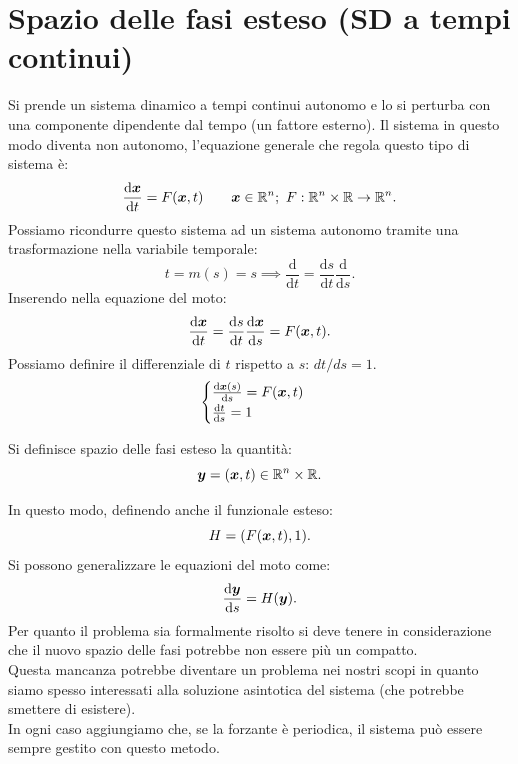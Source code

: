 \section{Spazio delle fasi esteso (SD a tempi continui)}%
\label{sub:Spazio delle fasi esteso (SD a tempi continui)}
Si prende un sistema dinamico a tempi continui autonomo e lo si perturba con una componente dipendente dal tempo (un fattore esterno). Il sistema in questo modo diventa non autonomo, l'equazione generale che regola questo tipo di sistema è:
\[
    \frac{\text{d} \boldsymbol{x}}{\text{d} t} = F(\boldsymbol{x},t) \qquad \boldsymbol{x}\in \mathbb{R}^n; \ F: \mathbb{R}^n \times \mathbb{R}\to \mathbb{R}^n
.\] 
Possiamo ricondurre questo sistema ad un sistema autonomo tramite una trasformazione nella variabile temporale:
\[
    t = m(s) = s \implies  \frac{\text{d} }{\text{d} t} = \frac{\text{d} s}{\text{d} t} \frac{\text{d} }{\text{d} s} 
.\] 
Inserendo nella equazione del moto:
\[
    \frac{\text{d} \boldsymbol{x}}{\text{d} t} = \frac{\text{d} s}{\text{d} t} \frac{\text{d} \boldsymbol{x}}{\text{d} s} = F(\boldsymbol{x}, t)
.\] 
Possiamo definire il differenziale di $t$  rispetto a $s$: $dt /ds = 1$.
\[
    \begin{cases}
	\frac{\text{d} \boldsymbol{x} (s)}{\text{d} s} = F(\boldsymbol{x}, t)\\
	\frac{\text{d} t}{\text{d} s} = 1
    \end{cases}
\] 
\begin{defn}
    Si definisce spazio delle fasi esteso la quantità:
    \[
	\boldsymbol{y} =(\boldsymbol{x}, t) \in \mathbb{R}^n \times \mathbb{R}
    .\] 
\end{defn}
\noindent
In questo modo, definendo anche il funzionale esteso:
\[
    H = (F(\boldsymbol{x}, t), 1)
.\] 
Si possono generalizzare le equazioni del moto come:
\[
    \frac{\text{d} \boldsymbol{y}}{\text{d} s} = H(\boldsymbol{y})
.\] 
Per quanto il problema sia formalmente risolto si deve tenere in considerazione che il nuovo spazio delle fasi potrebbe non essere più un compatto.\\
Questa mancanza potrebbe diventare un problema nei nostri scopi in quanto siamo spesso interessati alla soluzione asintotica del sistema (che potrebbe smettere di esistere).\\
In ogni caso aggiungiamo che, se la forzante è periodica, il sistema può essere sempre gestito con questo metodo.
